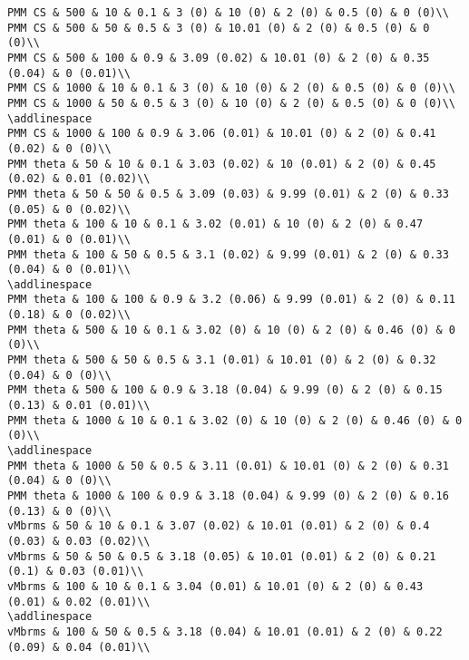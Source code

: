 \documentclass[
]{article}
\begin{document}
\begin{verbatim}
PMM CS & 500 & 10 & 0.1 & 3 (0) & 10 (0) & 2 (0) & 0.5 (0) & 0 (0)\\
PMM CS & 500 & 50 & 0.5 & 3 (0) & 10.01 (0) & 2 (0) & 0.5 (0) & 0 (0)\\
PMM CS & 500 & 100 & 0.9 & 3.09 (0.02) & 10.01 (0) & 2 (0) & 0.35 (0.04) & 0 (0.01)\\
PMM CS & 1000 & 10 & 0.1 & 3 (0) & 10 (0) & 2 (0) & 0.5 (0) & 0 (0)\\
PMM CS & 1000 & 50 & 0.5 & 3 (0) & 10 (0) & 2 (0) & 0.5 (0) & 0 (0)\\
\addlinespace
PMM CS & 1000 & 100 & 0.9 & 3.06 (0.01) & 10.01 (0) & 2 (0) & 0.41 (0.02) & 0 (0)\\
PMM theta & 50 & 10 & 0.1 & 3.03 (0.02) & 10 (0.01) & 2 (0) & 0.45 (0.02) & 0.01 (0.02)\\
PMM theta & 50 & 50 & 0.5 & 3.09 (0.03) & 9.99 (0.01) & 2 (0) & 0.33 (0.05) & 0 (0.02)\\
PMM theta & 100 & 10 & 0.1 & 3.02 (0.01) & 10 (0) & 2 (0) & 0.47 (0.01) & 0 (0.01)\\
PMM theta & 100 & 50 & 0.5 & 3.1 (0.02) & 9.99 (0.01) & 2 (0) & 0.33 (0.04) & 0 (0.01)\\
\addlinespace
PMM theta & 100 & 100 & 0.9 & 3.2 (0.06) & 9.99 (0.01) & 2 (0) & 0.11 (0.18) & 0 (0.02)\\
PMM theta & 500 & 10 & 0.1 & 3.02 (0) & 10 (0) & 2 (0) & 0.46 (0) & 0 (0)\\
PMM theta & 500 & 50 & 0.5 & 3.1 (0.01) & 10.01 (0) & 2 (0) & 0.32 (0.04) & 0 (0)\\
PMM theta & 500 & 100 & 0.9 & 3.18 (0.04) & 9.99 (0) & 2 (0) & 0.15 (0.13) & 0.01 (0.01)\\
PMM theta & 1000 & 10 & 0.1 & 3.02 (0) & 10 (0) & 2 (0) & 0.46 (0) & 0 (0)\\
\addlinespace
PMM theta & 1000 & 50 & 0.5 & 3.11 (0.01) & 10.01 (0) & 2 (0) & 0.31 (0.04) & 0 (0)\\
PMM theta & 1000 & 100 & 0.9 & 3.18 (0.04) & 9.99 (0) & 2 (0) & 0.16 (0.13) & 0 (0)\\
vMbrms & 50 & 10 & 0.1 & 3.07 (0.02) & 10.01 (0.01) & 2 (0) & 0.4 (0.03) & 0.03 (0.02)\\
vMbrms & 50 & 50 & 0.5 & 3.18 (0.05) & 10.01 (0.01) & 2 (0) & 0.21 (0.1) & 0.03 (0.01)\\
vMbrms & 100 & 10 & 0.1 & 3.04 (0.01) & 10.01 (0) & 2 (0) & 0.43 (0.01) & 0.02 (0.01)\\
\addlinespace
vMbrms & 100 & 50 & 0.5 & 3.18 (0.04) & 10.01 (0.01) & 2 (0) & 0.22 (0.09) & 0.04 (0.01)\\

\end{verbatim}
\end{document}
